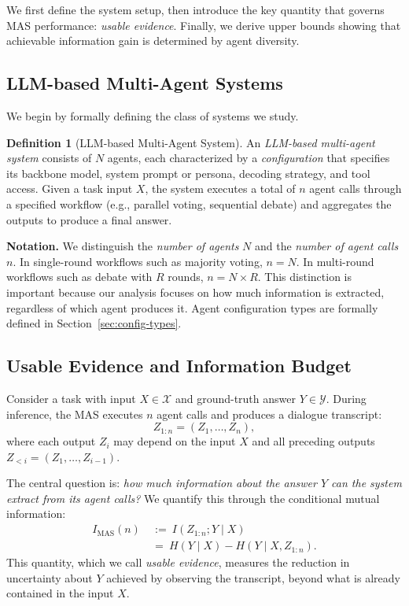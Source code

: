 \documentclass{article}
\theoremstyle{plain}
\theoremstyle{definition}
\newtheorem{definition}[theorem]{Definition}
\theoremstyle{remark}
\begin{document}
We first define the system setup, then introduce the key quantity that governs MAS performance: \emph{usable evidence}. Finally, we derive upper bounds showing that achievable information gain is determined by agent diversity.

\subsection{LLM-based Multi-Agent Systems}
\label{sec:mas-definition}

We begin by formally defining the class of systems we study.

\begin{definition}[LLM-based Multi-Agent System]
\label{def:llm-mas}
An \emph{LLM-based multi-agent system} consists of $N$ agents, each characterized by a \emph{configuration} that specifies its backbone model, system prompt or persona, decoding strategy, and tool access. Given a task input $X$, the system executes a total of $n$ agent calls through a specified workflow (e.g., parallel voting, sequential debate) and aggregates the outputs to produce a final answer.
\end{definition}

\vspace{-0.2cm}
\noindent\textbf{Notation.} We distinguish the \emph{number of agents} $N$ and the \emph{number of agent calls} $n$. In single-round workflows such as majority voting, $n = N$. In multi-round workflows such as debate with $R$ rounds, $n= N \times R$.
This distinction is important because our analysis focuses on how much information is extracted, regardless of which agent produces it. Agent configuration types are formally defined in Section~\ref{sec:config-types}.

\subsection{Usable Evidence and Information Budget}
\label{sec:info-budget}

Consider a task with input $X \in \mathcal{X}$ and ground-truth answer $Y \in \mathcal{Y}$. During inference, the MAS executes $n$ agent calls and produces a dialogue transcript:
\begin{equation}
Z_{1:n} = (Z_1, \ldots, Z_n),
\label{eq:transcript}
\end{equation}
where each output $Z_i$ may depend on the input $X$ and all preceding outputs $Z_{<i} = (Z_1, \ldots, Z_{i-1})$.

The central question is: \emph{how much information about the answer $Y$ can the system extract from its agent calls?} We quantify this through the conditional mutual information:
\vspace{-0.1cm}
\begin{align}\label{eq:imas}
  I_{\mathrm{MAS}}(n)
  ~&:=~
  I(Z_{1:n};Y\mid X)
  \nonumber\\
  ~&=~
  H(Y\mid X)-H(Y\mid X,Z_{1:n}).
\end{align}
This quantity, which we call \emph{usable evidence}, measures the reduction in uncertainty about $Y$ achieved by observing the transcript, beyond what is already contained in the input $X$.
\end{document}
